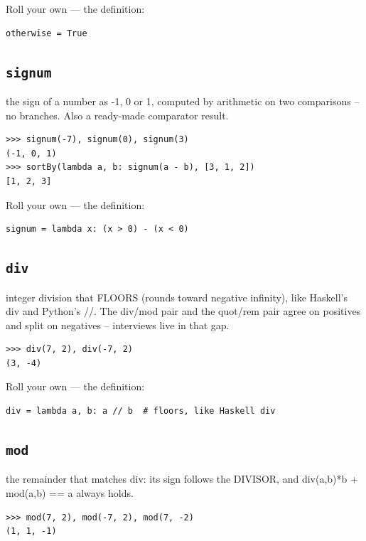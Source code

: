 \documentclass[10pt,letterpaper]{book}
\begin{document}
Roll your own --- the definition:

\begin{lstlisting}[style=ex]
otherwise = True
\end{lstlisting}

\subsection{\texttt{signum}}\label{def:signum}
the sign of a number as -1, 0 or 1, computed by arithmetic on two comparisons -- no branches. Also a ready-made comparator result.
\begin{lstlisting}[style=ex]
>>> signum(-7), signum(0), signum(3)
(-1, 0, 1)
>>> sortBy(lambda a, b: signum(a - b), [3, 1, 2])
[1, 2, 3]
\end{lstlisting}

Roll your own --- the definition:

\begin{lstlisting}[style=ex]
signum = lambda x: (x > 0) - (x < 0)
\end{lstlisting}

\subsection{\texttt{div}}\label{def:div}
integer division that FLOORS (rounds toward negative infinity), like Haskell's div and Python's //. The div/mod pair and the quot/rem pair agree on positives and split on negatives -- interviews live in that gap.
\begin{lstlisting}[style=ex]
>>> div(7, 2), div(-7, 2)
(3, -4)
\end{lstlisting}

Roll your own --- the definition:

\begin{lstlisting}[style=ex]
div = lambda a, b: a // b  # floors, like Haskell div
\end{lstlisting}
\subsection{\texttt{mod}}\label{def:mod}
the remainder that matches div: its sign follows the DIVISOR, and div(a,b)*b + mod(a,b) == a always holds.
\begin{lstlisting}[style=ex]
>>> mod(7, 2), mod(-7, 2), mod(7, -2)
(1, 1, -1)
\end{lstlisting}
\end{document}
